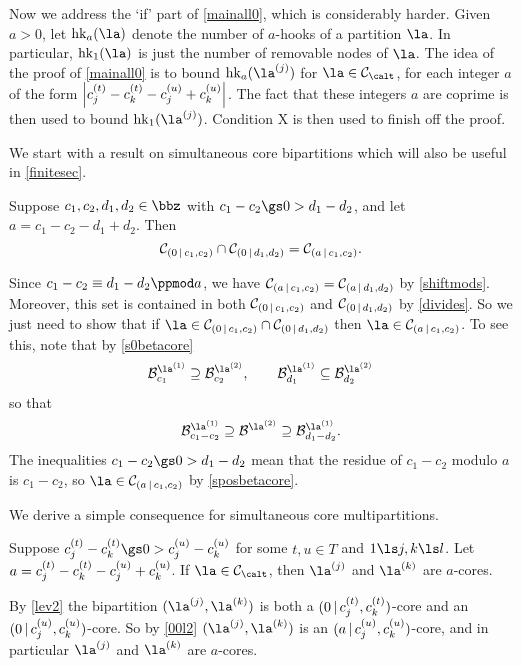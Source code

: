 \documentclass[a4paper, 11pt, twoside]{article}
\begin{document}
Now we address the `if' part of \cref{mainall0}, which is considerably harder. Given $a>0$, let $\hk a\la$ denote the number of $a$-hooks of a partition $\la$. In particular, $\hk1\la$ is just the number of removable nodes of $\la$. The idea of the proof of \cref{mainall0} is to bound $\hk a{\cpt\la j}$ for $\la\in\smc\calt$, for each integer $a$ of the form $\left|c^{(t)}_j-c^{(t)}_k-c^{(u)}_j+c^{(u)}_k\right|$. The fact that these integers $a$ are coprime is then used to bound $\hk1{\cpt\la j}$. Condition X is then used to finish off the proof.

We start with a result on simultaneous core bipartitions which will also be useful in \cref{finitesec}.

\begin{lemma}\label{00l2}
Suppose $c_1,c_2,d_1,d_2\in\bbz$ with $c_1-c_2\gs0>d_1-d_2$, and let $a=c_1-c_2-d_1+d_2$. Then
\[
\mathcal{C}_{(0\,|\,c_1,c_2)}\cap\mathcal{C}_{(0\,|\,d_1,d_2)}=\mathcal{C}_{(a\,|\,c_1,c_2)}.
\]
\end{lemma}

\begin{pf}
Since $c_1-c_2\equiv d_1-d_2\ppmod a$, we have $\mathcal{C}_{(a\,|\,c_1,c_2)}=\mathcal{C}_{(a\,|\,d_1,d_2)}$ by \cref{shiftmods}. Moreover, this set is contained in both $\mathcal{C}_{(0\,|\,c_1,c_2)}$ and $\mathcal{C}_{(0\,|\,d_1,d_2)}$ by \cref{divides}. So we just need to show that if $\la\in\mc0{c_1,c_2}\cap\mc0{d_1,d_2}$ then $\la\in\mc a{c_1,c_2}$. To see this, note that by \ref{s0betacore}
\[
\ber{\cpt\la1}{c_1}\supseteq\ber{\cpt\la2}{c_2},\qquad\ber{\cpt\la1}{d_1}\subseteq\ber{\cpt\la2}{d_2}
\]
so that
\[
\ber{\cpt\la1}{c_1-c_2}\supseteq\be{\cpt\la2}\supseteq\ber{\cpt\la1}{d_1-d_2}.
\]
The inequalities $c_1-c_2\gs0>d_1-d_2$ mean that the residue of $c_1-c_2$ modulo $a$ is $c_1-c_2$, so $\la\in\mc a{c_1,c_2}$ by \ref{sposbetacore}.
\end{pf}

We derive a simple consequence for simultaneous core multipartitions.

\begin{cory}\label{simbiopp2}
Suppose $\sof ct_j-\sof ct_k\gs0>\sof cu_j-\sof cu_k$ for some $t,u\in T$ and $1\ls j,k\ls l$. Let $a=c^{(t)}_j-c^{(t)}_k-c^{(u)}_j+c^{(u)}_k$. If $\la\in\smc\calt$, then $\cpt\la j$ and $\cpt\la k$ are $a$-cores.
\end{cory}

\begin{pf}
By \cref{lev2} the bipartition $(\cpt\la j,\cpt\la k)$ is both a $(0\,|\,c^{(t)}_j,c^{(t)}_k)$-core and an $(0\,|\,c^{(u)}_j,c^{(u)}_k)$-core. So by \cref{00l2} $(\cpt\la j,\cpt\la k)$ is an $(a\,|\,c^{(u)}_j,c^{(u)}_k)$-core, and in particular $\cpt\la j$ and $\cpt\la k$ are $a$-cores.
\end{pf}
\end{document}
